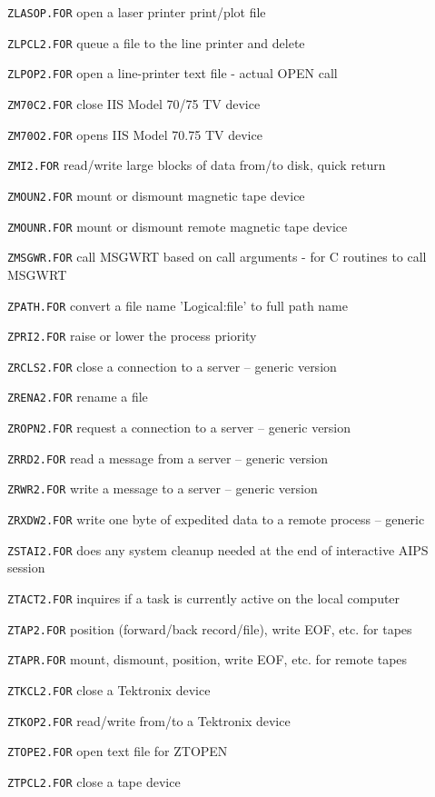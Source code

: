 {\item{\tt ZLASOP.FOR} open a laser printer print/plot file
\item{\tt ZLPCL2.FOR} queue a file to the line printer and delete
\item{\tt ZLPOP2.FOR} open a line-printer text file - actual OPEN call
\item{\tt ZM70C2.FOR} close IIS Model 70/75 TV device
\item{\tt ZM70O2.FOR} opens IIS Model 70.75 TV device
\item{\tt ZMI2.FOR} read/write large blocks of data from/to disk, quick return
\item{\tt ZMOUN2.FOR} mount or dismount magnetic tape device
\item{\tt ZMOUNR.FOR} mount or dismount remote magnetic tape device
\item{\tt ZMSGWR.FOR} call MSGWRT based on call arguments - for C routines to call MSGWRT
\item{\tt ZPATH.FOR} convert a file name 'Logical:file' to full path name
\item{\tt ZPRI2.FOR} raise or lower the process priority
\item{\tt ZRCLS2.FOR} close a connection to a server -- generic version
\item{\tt ZRENA2.FOR} rename a file
\item{\tt ZROPN2.FOR} request a connection to a server -- generic version
\item{\tt ZRRD2.FOR} read a message from a server -- generic version
\item{\tt ZRWR2.FOR} write a message to a server -- generic version
\item{\tt ZRXDW2.FOR} write one byte of expedited data to a remote process -- generic
\item{\tt ZSTAI2.FOR} does any system cleanup needed at the end of interactive AIPS session
\item{\tt ZTACT2.FOR} inquires if a task is currently active on the local computer
\item{\tt ZTAP2.FOR} position (forward/back record/file), write EOF, etc. for tapes
\item{\tt ZTAPR.FOR} mount, dismount, position, write EOF, etc. for remote tapes
\item{\tt ZTKCL2.FOR} close a Tektronix device
\item{\tt ZTKOP2.FOR} read/write from/to a Tektronix device
\item{\tt ZTOPE2.FOR} open text file for ZTOPEN
\item{\tt ZTPCL2.FOR} close a tape device
}
